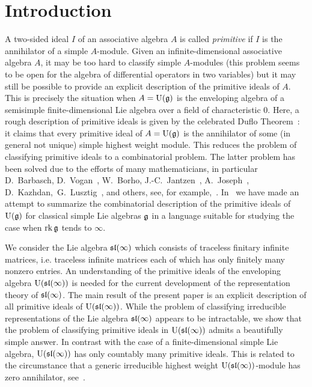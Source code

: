 \documentclass[10pt]{amsart}\oddsidemargin -1mm \evensidemargin -1mm \topmargin -15mm\headheight5mm \headsep 3.5mm \textheight 245mm\textwidth 170mm %
\begin{document}
\section{Introduction} A two-sided ideal $I$ of an associative algebra $A$ is called {\it primitive} if $I$ is the annihilator of a simple $A$-module. Given an infinite-dimensional associative algebra $A$,
it may be too hard to classify simple $A$-modules (this problem seems to be open for the algebra of differential operators in two variables) but it may still  be possible to provide an explicit  description of the primitive ideals of $A$. This is precisely the situation when $A=\operatorname{\mathrm{U}}(\frak g)$ is the enveloping algebra of a semisimple finite-dimensional Lie algebra over a field of characteristic 0. Here, a rough description of primitive ideals is given by the celebrated Duflo Theorem~\cite{Du}: it claims that every primitive ideal of $A=\operatorname{\mathrm{U}}(\frak g)$ is the annihilator of some (in general not unique)  simple highest weight module. This reduces the problem of classifying primitive ideals to a combinatorial problem. The latter problem has been solved due to the efforts of many mathematicians, in particular D.~Barbasch, D.~Vogan~\cite{BV1, BV2}, W.~Borho, J.-C.~Jantzen~\cite{BJ}, A.~Joseph~\cite{Jo}, D.~Kazhdan,~G.~Lusztig~\cite{Lu}, and others, see, for example,~\cite{Atl}. In~\cite{PP3} we have made an attempt to summarize the  combinatorial description of the primitive  ideals of $\operatorname{\mathrm{U}}(\frak g)$ for classical simple Lie algebras $\frak g$ in a language suitable for studying the case when $\operatorname{rk}\frak g$ tends to $\infty$.

We consider the Lie algebra $\frak{sl}(\infty)$ which consists of traceless finitary infinite matrices, i.e. traceless infinite  matrices each of which has only finitely many nonzero entries. 
An understanding of the primitive ideals of the enveloping algebra $\operatorname{\mathrm{U}}(\frak{sl}(\infty))$ is needed for the current development of the representation theory of $\frak{sl}(\infty)$. 
The main result of the present paper is an explicit description of all primitive ideals of $\operatorname{\mathrm{U}}(\frak{sl}(\infty))$. 
While the problem of classifying irreducible representations of the Lie algebra $\frak{sl}(\infty)$ appears to be intractable, we show that the problem of classifying primitive ideals in $\operatorname{\mathrm{U}}(\frak{sl}(\infty))$ admits a beautifully simple answer.
In contrast with the case of a finite-dimensional simple Lie  algebra, $\operatorname{\mathrm{U}}(\frak{sl}(\infty))$ has only countably many primitive ideals. 
This is related to the circumstance that a generic irreducible highest weight $\operatorname{\mathrm{U}}(\frak{sl}(\infty))$-module has zero annihilator, see~\cite{PP3}.
\end{document}
